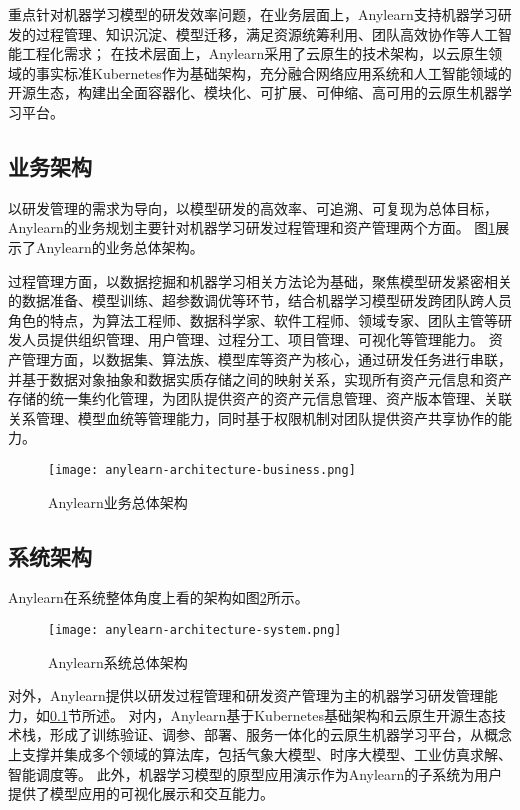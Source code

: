 重点针对机器学习模型的研发效率问题，在业务层面上，Anylearn支持机器学习研发的过程管理、知识沉淀、模型迁移，满足资源统筹利用、团队高效协作等人工智能工程化需求；
在技术层面上，Anylearn采用了云原生的技术架构，以云原生领域的事实标准Kubernetes作为基础架构，充分融合网络应用系统和人工智能领域的开源生态，构建出全面容器化、模块化、可扩展、可伸缩、高可用的云原生机器学习平台。

\subsection{业务架构}
\label{sec:anylearnbusiness}

以研发管理的需求为导向，以模型研发的高效率、可追溯、可复现为总体目标，Anylearn的业务规划主要针对机器学习研发过程管理和资产管理两个方面。
图\ref{fig:anylearnbusiness}展示了Anylearn的业务总体架构。

过程管理方面，以数据挖掘和机器学习相关方法论\cite{Wir00, Ame19}为基础，聚焦模型研发紧密相关的数据准备、模型训练、超参数调优等环节，结合机器学习模型研发跨团队跨人员角色的特点，为算法工程师、数据科学家、软件工程师、领域专家、团队主管等研发人员提供组织管理、用户管理、过程分工、项目管理、可视化等管理能力。
资产管理方面，以数据集、算法族、模型库等资产为核心，通过研发任务进行串联，并基于数据对象抽象和数据实质存储之间的映射关系，实现所有资产元信息和资产存储的统一集约化管理，为团队提供资产的资产元信息管理、资产版本管理、关联关系管理、模型血统等管理能力，同时基于权限机制对团队提供资产共享协作的能力。

\begin{figure}
  \centering
  \texttt{[image: anylearn-architecture-business.png]}
  \caption{Anylearn业务总体架构}
  \label{fig:anylearnbusiness}
\end{figure}

\subsection{系统架构}

Anylearn在系统整体角度上看的架构如图\ref{fig:anylearnsys}所示。

\begin{figure}
  \centering
  \texttt{[image: anylearn-architecture-system.png]}
  \caption{Anylearn系统总体架构}
  \label{fig:anylearnsys}
\end{figure}

对外，Anylearn提供以研发过程管理和研发资产管理为主的机器学习研发管理能力，如\ref{sec:anylearnbusiness}节所述。
对内，Anylearn基于Kubernetes基础架构和云原生开源生态技术栈，形成了训练验证、调参、部署、服务一体化的云原生机器学习平台，从概念上支撑并集成多个领域的算法库，包括气象大模型、时序大模型、工业仿真求解、智能调度等。
此外，机器学习模型的原型应用演示作为Anylearn的子系统为用户提供了模型应用的可视化展示和交互能力。


